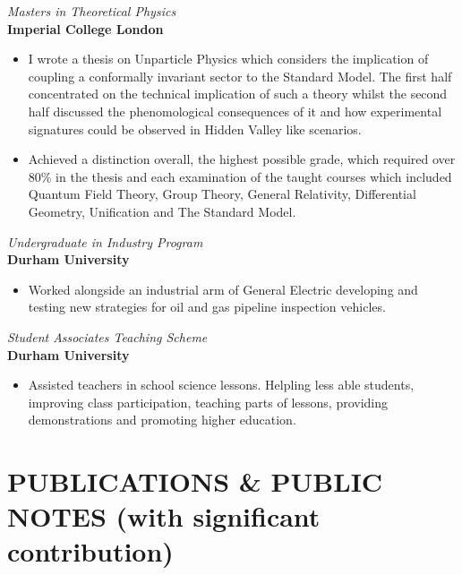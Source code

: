 \documentclass[margin, 10pt]{res} %
\begin{document}
\begin{resume}
{\sl Masters in Theoretical Physics}\\
{\bf Imperial College London}
\begin{itemize} \itemsep -2pt %
\item I wrote a thesis on Unparticle Physics which considers the implication of coupling a conformally invariant sector to the Standard Model. The first half concentrated on the technical implication of such a theory whilst the second half discussed the phenomological consequences of it and how experimental signatures could be observed in Hidden Valley like scenarios.
\item Achieved a distinction overall, the highest possible grade, which required over 80\% in the thesis and each examination of the taught courses which included Quantum Field Theory, Group Theory, General Relativity, Differential Geometry, Unification and The Standard Model.
\end{itemize}

{\sl Undergraduate in Industry Program}\\
{\bf Durham University}
\begin{itemize} \itemsep -2pt %
\item Worked alongside an industrial arm of General Electric developing and testing new strategies for oil and gas pipeline inspection vehicles.
\end{itemize}

{\sl Student Associates Teaching Scheme}\\
{\bf Durham University}
\begin{itemize} \itemsep -2pt %
\item Assisted teachers in school science lessons. Helpling less able students, improving class participation, teaching parts of lessons, providing demonstrations and promoting higher education.
\end{itemize}


\section{PUBLICATIONS \& PUBLIC NOTES \newline(with significant contribution)}


\end{resume}
\end{document}

